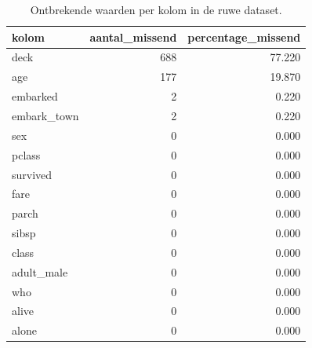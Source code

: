 \begin{table}[htbp]
\caption{Ontbrekende waarden per kolom in de ruwe dataset.}
\label{tab:ontbrekend}
\begin{tabular}{lrr}
\toprule
kolom & aantal\_missend & percentage\_missend \\
\midrule
deck & 688 & 77.220 \\
age & 177 & 19.870 \\
embarked & 2 & 0.220 \\
embark\_town & 2 & 0.220 \\
sex & 0 & 0.000 \\
pclass & 0 & 0.000 \\
survived & 0 & 0.000 \\
fare & 0 & 0.000 \\
parch & 0 & 0.000 \\
sibsp & 0 & 0.000 \\
class & 0 & 0.000 \\
adult\_male & 0 & 0.000 \\
who & 0 & 0.000 \\
alive & 0 & 0.000 \\
alone & 0 & 0.000 \\
\bottomrule
\end{tabular}
\end{table}
